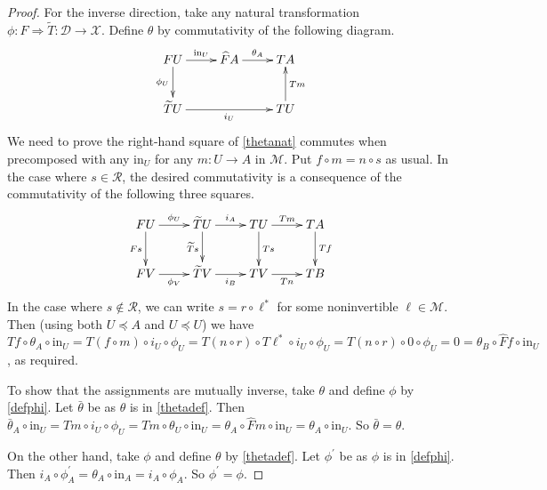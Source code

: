 \documentclass[a4paper,12pt,reqno]{amsart}
\theoremstyle{definition}
\theoremstyle{fact}
\theoremstyle{genquest}
\theoremstyle{step}
\newcommand{\ra}{\rightarrow}
\def\CD{{\mathscr D}}
\def\CM{{\mathscr M}}
\def\CR{{\mathscr R}}
\def\CX{{\mathscr X}}
\begin{document}
\begin{proof}
For the inverse direction, take any natural transformation $\phi : F\Rightarrow \widetilde{T} : \CD\ra \CX$.
Define $\theta$ by commutativity of the following diagram.
\begin{equation}\label{thetadef}
\begin{aligned}
\xymatrix{
FU \ar[r]^-{\mathrm{in}_U} \ar[d]_-{\phi_U} & \widehat{F}A  \ar[r]^-{\theta_A} & TA \\
\widetilde{T}U \ar[rr]_-{i_U} &  & TU \ar[u]_-{Tm}}
\end{aligned}
\end{equation}       
We need to prove the right-hand square of \eqref{thetanat} commutes when precomposed
with any $\mathrm{in}_U$ for any $m:U\ra A$ in $\CM$. 
Put $f\circ m = n\circ s$ as usual. 
In the case where $s\in \CR$, the desired commutativity is a consequence of the commutativity of the following three squares.
\begin{equation}\label{pfthetanat}
\begin{aligned}
\xymatrix{
FU \ar[r]^-{\phi_U} \ar[d]_-{Fs} & \widetilde{T}U \ar[d]_-{\widetilde{T}s} \ar[r]^-{i_A} & TU \ar[r]^-{Tm} \ar[d]^-{Ts} & TA \ar[d]^-{Tf}\\
FV \ar[r]_-{\phi_V} & \widetilde{T}V  \ar[r]_-{i_B} & TV \ar[r]_-{Tn} & TB}
\end{aligned}
\end{equation}
In the case where $s\notin \CR$, we can write $s = r\circ \ell^*$ for some noninvertible $\ell \in \CM$.
Then (using both $U\preceq A$ and $U\preceq U$) we have $Tf \circ \theta_A \circ \mathrm{in}_U = T(f\circ m)\circ i_U \circ \phi_U =T(n\circ r) \circ T\ell^*\circ i_U \circ \phi_U = T(n\circ r) \circ 0 \circ \phi_U = 0 = \theta_B \circ \widehat{F}f \circ \mathrm{in}_U$, as required.

To show that the assignments are mutually inverse, take $\theta$ and define $\phi$ by \eqref{defphi}. 
Let $\bar{\theta}$ be as $\theta$ is in \eqref{thetadef}. Then $\bar{\theta}_A\circ \mathrm{in}_U = Tm \circ i_U\circ \phi_U = Tm \circ \theta_U \circ \mathrm{in}_{U} = \theta_A \circ \widehat{F}m\circ \mathrm{in}_{U} = \theta_A \circ \mathrm{in}_U$. So $\bar{\theta} = \theta$. 

On the other hand, take $\phi$ and define $\theta$ by \eqref{thetadef}. 
Let $\phi^{\prime}$ be as $\phi$ is in \eqref{defphi}. 
Then $i_A \circ \phi^{\prime}_A = \theta_A \circ \mathrm{in}_{A} = i_A\circ \phi_A$. 
So $\phi^{\prime} = \phi$.     
\end{proof}
\end{document}

